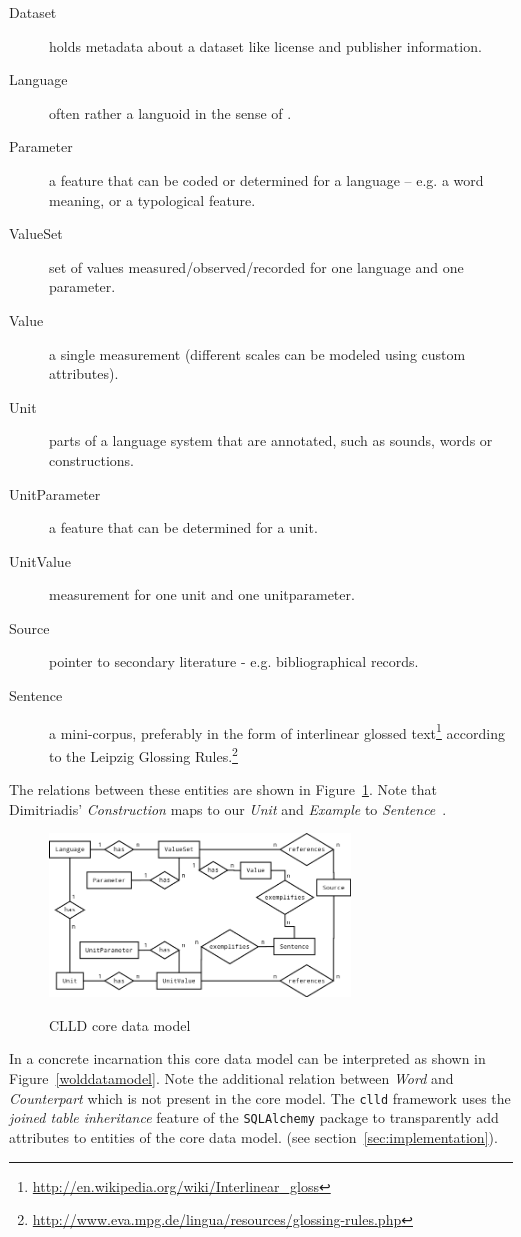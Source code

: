 \documentclass[a4paper,10pt]{article}
\begin{document}
\begin{description}
\item[Dataset] holds metadata about a dataset like license and publisher information.
\item[Language] often rather a languoid in the sense of .
\item[Parameter] a feature that can be coded or determined for a language
-- e.g. a word meaning, or a typological feature.
\item[ValueSet] set of values measured/observed/recorded for one language and one parameter.
\item[Value] a single measurement (different scales can be modeled using custom attributes).
\item[Unit] parts of a language system that are annotated, such as sounds, words or constructions.
\item[UnitParameter] a feature that can be determined for a unit.
\item[UnitValue] measurement for one unit and one unitparameter.
\item[Source] pointer to secondary literature - e.g. bibliographical records.
\item[Sentence] a mini-corpus, preferably in the form of interlinear glossed text\footnote{\url{http://en.wikipedia.org/wiki/Interlinear\_gloss}} according to the Leipzig Glossing Rules.\footnote{\url{http://www.eva.mpg.de/lingua/resources/glossing-rules.php}}
\end{description}

The relations between these entities are shown in Figure~\ref{cllddatamodel}. Note that Dimitriadis' \emph{Construction} maps to our \emph{Unit} and \emph{Example} to \emph{Sentence}~\cite[p.~15]{burs}.

\begin{figure}[h!]
  \caption{CLLD core data model}
  \centering
\includegraphics[width=8cm]{clld_erd.png}
\label{cllddatamodel}
\end{figure}

In a concrete incarnation this core data model can be interpreted as shown in Figure~\ref{wolddatamodel}.
Note the additional relation between \emph{Word} and \emph{Counterpart} which is not present in the core model.
The \texttt{clld} framework uses the \emph{joined table inheritance} feature of the \texttt{SQLAlchemy} package
to transparently add attributes to entities of the core data model. 
(see section~\ref{sec:implementation}).
\end{document}
